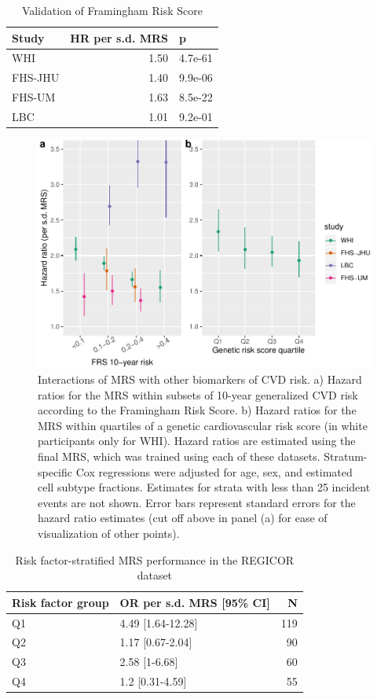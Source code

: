 \documentclass[]{article}
\begin{document}
\begin{longtable}[t]{lrl}
\caption{\label{tab:risk-score-validation}Validation of Framingham Risk Score}\\
\toprule
Study & HR per s.d. MRS & p\\
\midrule
WHI & 1.50 & 4.7e-61\\
FHS-JHU & 1.40 & 9.9e-06\\
FHS-UM & 1.63 & 8.5e-22\\
LBC & 1.01 & 9.2e-01\\
\bottomrule
\end{longtable}

\newpage

\begin{figure}[h]
\includegraphics{figures/interactions-1} \caption{Interactions of MRS with other biomarkers of CVD risk. a) Hazard ratios for the MRS within subsets of 10-year generalized CVD risk according to the Framingham Risk Score. b) Hazard ratios for the MRS within quartiles of a genetic cardiovascular risk score (in white participants only for WHI). Hazard ratios are estimated using the final MRS, which was trained using each of these datasets. Stratum-specific Cox regressions were adjusted for age, sex, and estimated cell subtype fractions. Estimates for strata with less than 25 incident events are not shown. Error bars represent standard errors for the hazard ratio estimates (cut off above in panel (a) for ease of visualization of other points).}\label{fig:interactions}
\end{figure}

\begin{longtable}[t]{llr}
\caption{\label{tab:regicor-interactions}Risk factor-stratified MRS performance in the REGICOR dataset}\\
\toprule
Risk factor group & OR per s.d. MRS [95\% CI] & N\\
\midrule
Q1 & 4.49 [1.64-12.28] & 119\\
Q2 & 1.17 [0.67-2.04] & 90\\
Q3 & 2.58 [1-6.68] & 60\\
Q4 & 1.2 [0.31-4.59] & 55\\
\bottomrule
\end{longtable}
\end{document}
